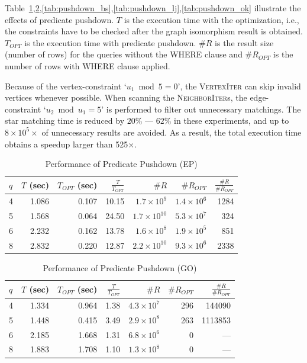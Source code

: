 Table~\ref{tab:pushdown_ep},\ref{tab:pushdown_go},\ref{tab:pushdown_bs},\ref{tab:pushdown_lj},\ref{tab:pushdown_ok} illustrate the effects of predicate pushdown.
$T$ is the execution time with the optimization, i.e., the constraints have to be checked after the graph isomorphism result is obtained.
$T_{OPT}$ is the execution time with predicate pushdown.
$\#R$ is the result size (number of rows) for the queries without the WHERE clause and $\#R_{OPT}$ is the number of rows with WHERE clause applied.

Because of the vertex-constraint `$u_1 \bmod 5 = 0$',
the \textsc{VertexIter} can skip invalid vertices whenever possible.
When scanning the \textsc{NeighborIter}s,
the edge-constraint `$u_2 \bmod u_1 = 5$' is performed to filter out unnecessary matchings.
The star matching time is reduced by $20\%$ --- $62\%$ in these experiments,
and up to $8 \times 10^5 \times$ of unnecessary results are avoided.
As a result, the total execution time obtains a speedup larger than 525$\times$.
\begin{table}
  \caption{Performance of Predicate Pushdown (EP)}\label{tab:pushdown_ep}
  \begin{tabular}{lrrrrrr}
    \toprule
    $q$ & \parbox{5mm}{$T$ (sec)} & \parbox{5mm}{$T_{OPT}$ (sec)} & $\frac{T}{T_{OPT}}$ & $\#R$ & $\#R_{OPT}$ & $\frac{\#R}{\#R_{OPT}}$ \\
     & 1.086 &     0.107 &     10.15 & $1.7 \times 10^9$   &   $1.4 \times 10^6$ &            1284 \\
    5 & 1.568 &     0.064 &     24.50 & $1.7 \times 10^{10}$ &   $5.3 \times 10^7$ &             324 \\
    6 & 2.232 &     0.162 &     13.78 & $1.6 \times 10^8$  &        $1.9 \times 10^5$ &             851 \\
    8 & 2.832 &     0.220 &     12.87 & $2.2 \times 10^{10}$ &   $9.3 \times 10^6$ &            2338 \\
    \bottomrule
  \end{tabular}
\end{table}

\begin{table}
  \caption{Performance of Predicate Pushdown (GO)}\label{tab:pushdown_go}
  \begin{tabular}{lrrrrrr}
    \toprule
    $q$ & \parbox{5mm}{$T$ (sec)} & \parbox{5mm}{$T_{OPT}$ (sec)} & $\frac{T}{T_{OPT}}$ & $\#R$ & $\#R_{OPT}$ & $\frac{\#R}{\#R_{OPT}}$ \\
     & 1.334 &     0.964 &     1.38 & $4.3\times10^7$ &           296 &               144090 \\
    5 & 1.448 &     0.415 &     3.49 & $2.9 \times 10^8$ &           263 &              1113853 \\
    6 & 2.185 &     1.668 &     1.31 & $6.8 \times 10^6$ &             0 & --- \\
    8 & 1.883 &     1.708 &     1.10 & $1.3\times10^8$ &             0 & --- \\
    \bottomrule
  \end{tabular}
\end{table}

